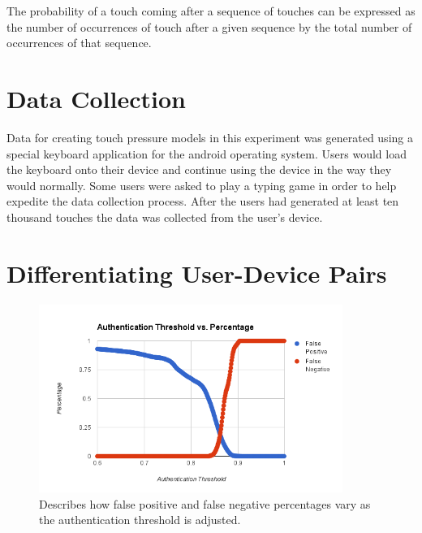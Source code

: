 \documentclass{acm_proc_article-sp}
\begin{document}
The probability of a touch coming after a sequence of touches can be expressed as the number of occurrences of touch after a given sequence by the total number of occurrences of that sequence.

\section{Data Collection}
\label{sec:data_collection}
Data for creating touch pressure models in this experiment was generated using a special keyboard application for the android operating system. Users would load the keyboard onto their device and continue using the device in the way they would normally. Some users were asked to play a typing game in order to help expedite the data collection process. After the users had generated at least ten thousand touches the data was collected from the user's device.

\section{Differentiating User-Device Pairs}
\label{sec:differentiation}

\begin{figure}
\centering
\includegraphics[width=3.9in]{threshold_vs_percentages.png}
\caption{Describes how false positive and false negative percentages vary as the authentication threshold is adjusted.}
\label{fig:threshold_vs_percentages}
\end{figure}
\end{document}
